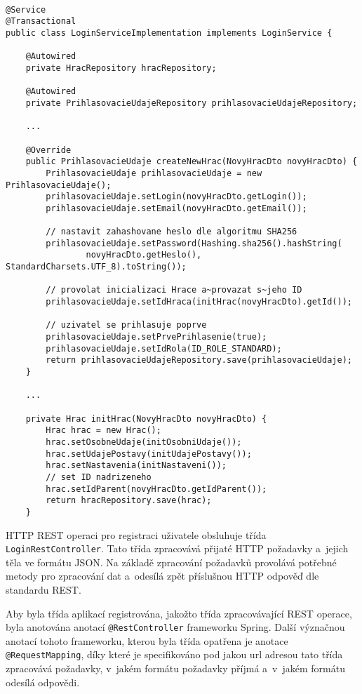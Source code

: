 \documentclass[12pt]{article}
\begin{document}
\begin{lstlisting}

@Service
@Transactional
public class LoginServiceImplementation implements LoginService {
    
    @Autowired
    private HracRepository hracRepository;

    @Autowired
    private PrihlasovacieUdajeRepository prihlasovacieUdajeRepository;
    
    ...

    @Override
    public PrihlasovacieUdaje createNewHrac(NovyHracDto novyHracDto) {
        PrihlasovacieUdaje prihlasovacieUdaje = new PrihlasovacieUdaje();
        prihlasovacieUdaje.setLogin(novyHracDto.getLogin());
        prihlasovacieUdaje.setEmail(novyHracDto.getEmail());

        // nastavit zahashovane heslo dle algoritmu SHA256
        prihlasovacieUdaje.setPassword(Hashing.sha256().hashString(
                novyHracDto.getHeslo(), StandardCharsets.UTF_8).toString());

        // provolat inicializaci Hrace a~provazat s~jeho ID
        prihlasovacieUdaje.setIdHraca(initHrac(novyHracDto).getId());

        // uzivatel se prihlasuje poprve
        prihlasovacieUdaje.setPrvePrihlasenie(true);
        prihlasovacieUdaje.setIdRola(ID_ROLE_STANDARD);
        return prihlasovacieUdajeRepository.save(prihlasovacieUdaje);
    }

    ...

    private Hrac initHrac(NovyHracDto novyHracDto) {
        Hrac hrac = new Hrac();
        hrac.setOsobneUdaje(initOsobniUdaje());
        hrac.setUdajePostavy(initUdajePostavy());
        hrac.setNastavenia(initNastaveni());
        // set ID nadrizeneho
        hrac.setIdParent(novyHracDto.getIdParent());
        return hracRepository.save(hrac);
    }
\end{lstlisting}

\clearpage

HTTP REST operaci pro registraci uživatele obsluhuje třída \texttt{LoginRestController}. 
Tato třída zpracovává přijaté HTTP požadavky a~jejich těla ve formátu JSON. Na základě zpracování požadavků provolává potřebné metody pro zpracování dat a~odesílá zpět příslušnou HTTP odpověď dle standardu REST.

Aby byla třída aplikací registrována, jakožto třída zpracovávající REST operace, byla anotována anotací \texttt{@RestController} frameworku Spring. Další význačnou anotací tohoto frameworku, kterou byla třída opatřena je anotace\texttt{ @RequestMapping}, díky které je specifikováno pod jakou url adresou tato třída zpracovává požadavky, v~jakém formátu požadavky příjmá a~v~jakém formátu odesílá odpovědi. 
\end{document}
